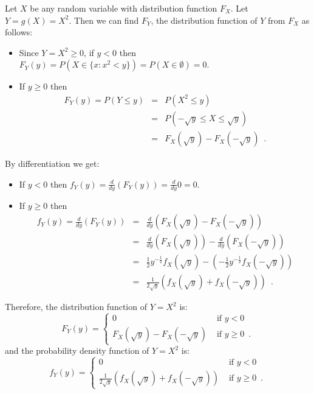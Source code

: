 \begin{example}
Let $X$ be any random variable with distribution function $F_X$.  Let $Y=g(X)=X^2$.  
Then we can find $F_Y$, the distribution function of $Y$ from $F_X$ as follows:
\begin{itemize}
\item {Since $Y=X^2 \geq 0$, if $y < 0$ then $F_Y(y) = P\left( X \in \{ x : x^2 < y\} \right) = P(X \in \emptyset) = 0$.}
\item {If $y \geq 0$ then
\begin{eqnarray*}
F_Y(y) = P \left(Y \leq y \right) 
&=& P \left( X^2 \leq y \right) \\
&=& P \left( -\sqrt{y} \leq X \leq \sqrt{y} \right) \\
&=& F_X(\sqrt{y}) - F_X(-\sqrt{y}) \enspace .
\end{eqnarray*}
}
\end{itemize}
By differentiation we get:
\begin{itemize}
\item {If $y<0$ then $f_Y(y)=\frac{d}{dy}(F_Y(y)) = \frac{d}{dy} 0 = 0$.}
\item {If $y \geq 0$ then
\begin{eqnarray*}
f_Y(y) 
= \frac{d}{dy}\left( F_Y(y) \right) 
&=& \frac{d}{dy}\left( F_X(\sqrt{y}) - F_X( - \sqrt{y}) \right)\\
&=& \frac{d}{dy}\left( F_X(\sqrt{y}) \right) - \frac{d}{dy}\left( F_X( - \sqrt{y}) \right)\\
&=& \frac{1}{2}y^{-\frac{1}{2}} f_X(\sqrt{y}) - \left( -\frac{1}{2}y^{-\frac{1}{2}} f_X( - \sqrt{y}) \right)\\
&=& \frac{1}{2 \sqrt{y}} \left( f_X(\sqrt{y}) + f_X( - \sqrt{y}) \right) \enspace .
\end{eqnarray*}
}
\end{itemize}
Therefore, the distribution function of $Y=X^2$ is:
\begin{equation}\label{E:F_YofX^2}
F_Y(y) = 
\begin{cases}
0 & \text{ if } y < 0 \\
F_X(\sqrt{y}) - F_X(-\sqrt{y}) & \text{ if } y \geq 0 \enspace .
\end{cases}
\end{equation}
and the probability density function of $Y=X^2$ is:
\begin{equation}\label{E:f_YofX^2}
f_Y(y) = 
\begin{cases}
0 & \text{ if } y < 0 \\
\frac{1}{2 \sqrt{y}} \left( f_X(\sqrt{y}) + f_X( - \sqrt{y}) \right) & \text{ if } y \geq 0 \enspace .
\end{cases}
\end{equation}
\end{example} 

